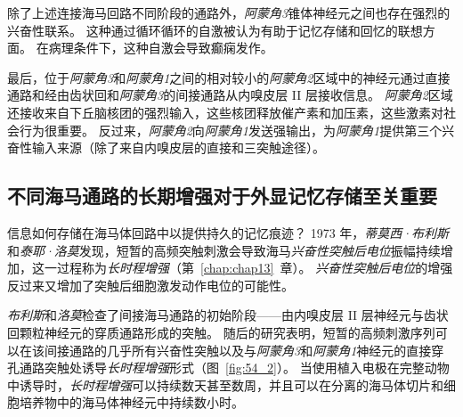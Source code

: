 除了上述连接海马回路不同阶段的通路外，\textit{阿蒙角3}锥体神经元之间也存在强烈的兴奋性联系。
这种通过循环循环的自激被认为有助于记忆存储和回忆的联想方面。
在病理条件下，这种自激会导致癫痫发作。


最后，位于\textit{阿蒙角3}和\textit{阿蒙角1}之间的相对较小的\textit{阿蒙角2}区域中的神经元通过直接通路和经由齿状回和\textit{阿蒙角3}的间接通路从内嗅皮层 II 层接收信息。
\textit{阿蒙角2}区域还接收来自下丘脑核团的强烈输入，这些核团释放催产素和加压素，这些激素对社会行为很重要。
反过来，\textit{阿蒙角2}向\textit{阿蒙角1}发送强输出，为\textit{阿蒙角1}提供第三个兴奋性输入来源（除了来自内嗅皮层的直接和三突触途径）。



\subsection{不同海马通路的长期增强对于外显记忆存储至关重要}

信息如何存储在海马体回路中以提供持久的记忆痕迹？
1973 年，\textit{蒂莫西·布利斯}和\textit{泰耶·洛莫}发现，短暂的高频突触刺激会导致海马\textit{兴奋性突触后电位}振幅持续增加，这一过程称为\textit{长时程增强}（第~\ref{chap:chap13}~章）。
\textit{兴奋性突触后电位}的增强反过来又增加了突触后细胞激发动作电位的可能性。


\textit{布利斯}和\textit{洛莫}检查了间接海马通路的初始阶段——由内嗅皮层 II 层神经元与齿状回颗粒神经元的穿质通路形成的突触。
随后的研究表明，短暂的高频刺激序列可以在该间接通路的几乎所有兴奋性突触以及与\textit{阿蒙角3}和\textit{阿蒙角1}神经元的直接穿孔通路突触处诱导\textit{长时程增强}形式（图~\ref{fig:54_2}）。
当使用植入电极在完整动物中诱导时，\textit{长时程增强}可以持续数天甚至数周，并且可以在分离的海马体切片和细胞培养物中的海马体神经元中持续数小时。


